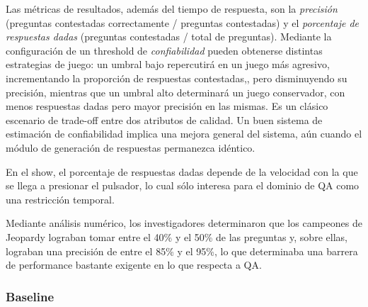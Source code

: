Las métricas de resultados, además del tiempo de respuesta, son la
\textit{precisión} (preguntas contestadas correctamente / preguntas
contestadas) y el \textit{porcentaje de respuestas dadas }(preguntas
contestadas / total de preguntas). Mediante la configuración de un
threshold de \textit{confiabilidad} pueden obtenerse distintas
estrategias de juego: un umbral bajo repercutirá en un juego más
agresivo, incrementando la proporción de respuestas contestadas,,
pero disminuyendo su precisión, mientras que un umbral alto
determinará un juego conservador, con menos respuestas dadas pero
mayor precisión en las mismas. Es un clásico escenario de trade-off
entre dos atributos de calidad. Un buen sistema de estimación de
confiabilidad implica una mejora general del sistema, aún cuando el
módulo de generación de respuestas permanezca idéntico.


\bigskip

En el show, el porcentaje de respuestas dadas depende de la velocidad
con la que se llega a presionar el pulsador, lo cual sólo interesa
para el dominio de QA como una restricción temporal. 


\bigskip

Mediante análisis numérico, los investigadores determinaron que los
campeones de Jeopardy lograban tomar entre el 40\% y el 50\% de las
preguntas y, sobre ellas, lograban una precisión de entre el 85\% y
el 95\%, lo que determinaba una barrera de performance bastante
exigente en lo que respecta a QA.


\bigskip

\subsubsection*{Baseline}

